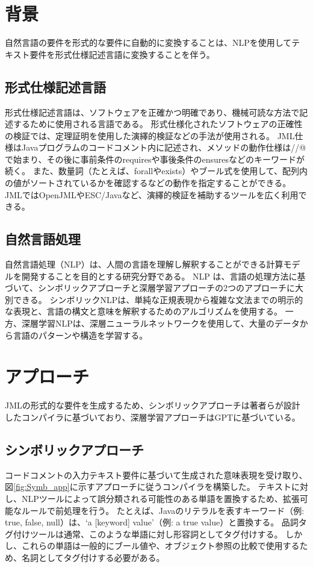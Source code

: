 \documentclass[uplatex, twocolumn,10pt]{jsarticle} %
\begin{document}
\section{背景}
\label{sec:background}
自然言語の要件を形式的な要件に自動的に変換することは、NLPを使用してテキスト要件を形式仕様記述言語に変換することを伴う。

\subsection{形式仕様記述言語}
形式仕様記述言語は、ソフトウェアを正確かつ明確であり、機械可読な方法で記述するために使用される言語である。
形式仕様化されたソフトウェアの正確性の検証では、定理証明を使用した演繹的検証などの手法が使用される。
JML仕様はJavaプログラムのコードコメント内に記述され、メソッドの動作仕様は//@で始まり、その後に事前条件のrequiresや事後条件のensuresなどのキーワードが続く。
また、数量詞（たとえば、forallやexists）やブール式を使用して、配列内の値がソートされているかを確認するなどの動作を指定することができる。
JMLではOpenJML\cite{4}やESC/Java\cite{6}など、演繹的検証を補助するツールを広く利用できる。

\subsection{自然言語処理}
自然言語処理（NLP）は、人間の言語を理解し解釈することができる計算モデルを開発することを目的とする研究分野である。
NLP は、言語の処理方法に基づいて、シンボリックアプローチと深層学習アプローチの2つのアプローチに大別できる。
シンボリックNLPは、単純な正規表現から複雑な文法までの明示的な表現と、言語の構文と意味を解釈するためのアルゴリズムを使用する\cite{3}。
一方、深層学習NLPは、深層ニューラルネットワークを使用して、大量のデータから言語のパターンや構造を学習する\cite{2}。

\section{アプローチ}
\label{sec:approaches}
JMLの形式的な要件を生成するため、シンボリックアプローチは著者らが設計したコンパイラに基づいており、深層学習アプローチはGPTに基づいている。

\subsection{シンボリックアプローチ}
コードコメントの入力テキスト要件に基づいて生成された意味表現を受け取り、図\ref{fig:Symb_app}に示すアプローチに従うコンパイラを構築した。
テキストに対し、NLPツールによって誤分類される可能性のある単語を置換するため、拡張可能なルールで前処理を行う。
たとえば、Javaのリテラルを表すキーワード（例: true, false, null）は、`a [keyword] value'（例: a true value）と置換する。
品詞タグ付けツールは通常、このような単語に対し形容詞としてタグ付けする。
しかし、これらの単語は一般的にブール値や、オブジェクト参照の比較で使用するため、名詞としてタグ付けする必要がある。
\end{document}
